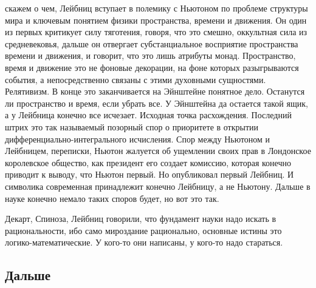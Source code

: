 \documentclass[a4paper, 12pt]{article}
\begin{document}
скажем о чем, Лейбниц вступает в полемику с Ньютоном по проблеме 
структуры мира и ключевым понятием физики пространства, времени 
и движения. Он один из первых критикует силу тяготения, говоря, что это 
смешно, оккультная сила из средневековья, дальше он отвергает 
субстанциальное восприятие пространства времени и движения, и говорит, 
что это лишь атрибуты монад. Пространство, время и движение это не 
фоновые декорации, на фоне которых разыгрываются события, 
а непосредственно связаны с этими духовными сущностями. Релятивизм. 
В конце это заканчивается на Эйнштейне понятное дело. Останутся ли 
пространство и время, если убрать все. У Эйнштейна да остается такой 
ящик, а у Лейбница конечно все исчезает. Исходная точка расхождения. 
Последний штрих это так называемый позорный спор о приоритете в открытии 
дифференциально-интегрального исчисления. Спор между Ньютоном 
и Лейбницем, переписки, Ньютон жалуется об ущемлении своих прав 
в Лондонское королевское общество, как президент его создает комиссию, 
которая конечно приводит к выводу, что Ньютон первый. Но опубликовал 
первый Лейбниц. И символика современная принадлежит конечно Лейбницу, 
а не Ньютону. Дальше в науке конечно немало таких споров будет, но вот 
это так.

Декарт, Спиноза, Лейбниц говорили, что фундамент науки надо искать 
в рациональности, ибо само мироздание рационально, основные истины это 
логико-математические. У кого-то они написаны, у кого-то надо стараться.

\subsection{Дальше}
\end{document}
